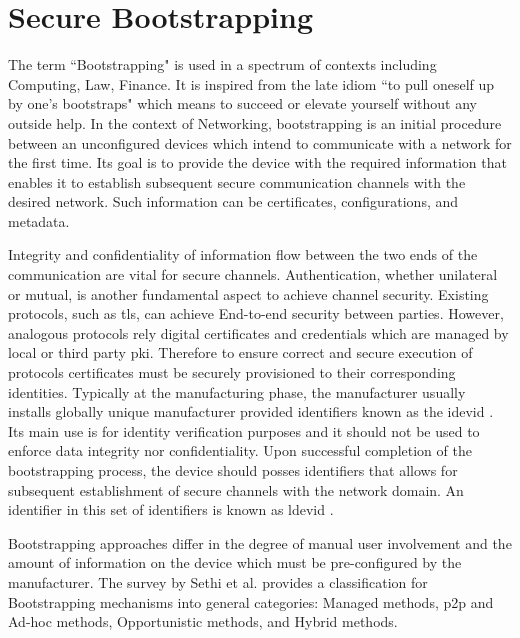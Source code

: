 \chapter{Secure Bootstrapping}
\label{ch:secureBootstrapping}
The term ``Bootstrapping" is used in a spectrum of contexts including Computing, Law, Finance. It is inspired from the late idiom ``to pull oneself up by one's bootstraps" which means to succeed or elevate yourself without any outside help. In the context of Networking, bootstrapping is an initial procedure between an unconfigured devices which intend to communicate with a network for the first time. Its goal is to provide the device with the required information that enables it to establish subsequent secure communication channels with the desired network. Such information can be certificates, configurations, and metadata.
\par
Integrity and confidentiality of information flow between the two ends of the communication are vital for secure channels. Authentication, whether unilateral or mutual, is another fundamental aspect to achieve channel security. Existing protocols, such as \gls{tls}, can achieve End-to-end security between parties. However, analogous protocols rely digital certificates and credentials which are managed by local or third party \gls{pki}. Therefore to ensure correct and secure execution of protocols certificates must be securely provisioned to their corresponding identities. Typically at the manufacturing phase, the manufacturer usually installs globally unique manufacturer provided identifiers known as the \gls{idevid} \cite{5367679}. Its main use is for identity verification purposes and it should not be used to enforce data integrity nor confidentiality. Upon successful completion of the bootstrapping process, the device should posses identifiers that allows for subsequent establishment of secure channels with the network domain. An identifier in this set of identifiers is known as \gls{ldevid} \cite{5367679}.
\par
Bootstrapping approaches differ in the degree of manual user involvement and the amount of information on the device which must be pre-configured by the manufacturer. The survey by Sethi et al. \cite{irtf-t2trg-secure-bootstrapping-00} provides a classification for Bootstrapping mechanisms into general categories: Managed methods, \gls{p2p} and Ad-hoc methods, Opportunistic methods, and Hybrid methods.
